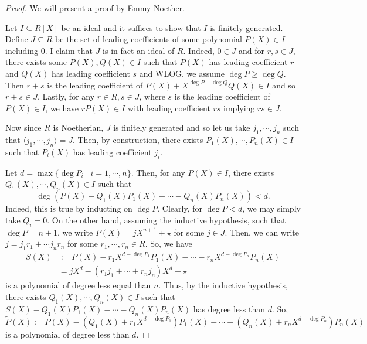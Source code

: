 \documentclass[]{article}
\theoremstyle{definition}
\theoremstyle{definition}
\begin{document}
\begin{proof}
  We will present a proof by Emmy Noether. 

  Let \(I \subseteq R[X]\) be an ideal and it suffices to show that \(I\) is 
  finitely generated. Define \(J \subseteq R\) be the set of leading coefficients 
  of some polynomial \(P(X) \in I\) including 0. I claim that \(J\) is in fact 
  an ideal of \(R\). Indeed, \(0 \in J\) and for \(r, s \in J\), there exists 
  some \(P(X), Q(X) \in I\) such that \(P(X)\) has leading coefficient \(r\) and 
  \(Q(X)\) has leading coefficient \(s\) and WLOG. we assume \(\deg P \ge \deg Q\). 
  Then \(r + s\) is the leading 
  coefficient of \(P(X) + X^{\deg P - \deg Q}Q(X) \in I\) and so \(r + s \in J\). Lastly, 
  for any \(r \in R, s \in J\), where \(s\) is the leading coefficient of 
  \(P(X) \in I\), we have \(r P(X) \in I\) with leading coefficient \(rs\) 
  implying \(rs \in J\).

  Now since \(R\) is Noetherian, \(J\) is finitely generated and so let us take 
  \(j_1, \cdots, j_n\) such that \(\langle j_1, \cdots, j_n \rangle = J\). 
  Then, by construction, there exists \(P_1(X), \cdots, P_n(X) \in I\) 
  such that \(P_i(X)\) has leading coefficient \(j_i\).

  Let \(d = \max \{\deg P_i \mid i = 1, \cdots, n\}\). Then, for any \(P(X) \in I\), 
  there exists \(Q_1(X), \cdots, Q_n(X) \in I\) such that 
  \[\deg(P(X) - Q_1(X)P_1(X) - \cdots - Q_n(X)P_n(X)) < d.\]
  Indeed, this is true by inducting on \(\deg P\). Clearly, for \(\deg P < d\), 
  we may simply take \(Q_i = 0\). On the other hand, assuming the inductive 
  hypothesis, such that \(\deg P = n + 1\), we write \(P(X) = j X^{n + 1} + \star\) 
  for some \(j \in J\). Then, we can write \(j = j_1 r_1 + \cdots j_n r_n\) for 
  some \(r_1, \cdots, r_n \in R\). So, 
  we have 
  \[\begin{split}
    S(X) & := P(X) - r_1 X^{d - \deg P_1}P_1(X) - \cdots -
    r_n X^{d - \deg P_n}P_n(X)\\
    & = jX^d - (r_1 j_1 + \cdots + r_n j_n)X^d + \star
  \end{split}\]
  is a polynomial of degree less equal than \(n\). Thus, by the 
  inductive hypothesis, there exists \(Q_1(X), \cdots, Q_n(X) \in I\) such that
  \(S(X) - Q_1(X)P_1(X) - \cdots - Q_n(X)P_n(X)\) has degree less than \(d\).
  So, 
  \[\tilde P(X) := P(X) - (Q_1(X) + r_1X^{d - \deg P_1})P_1(X) - \cdots -
    (Q_n(X) + r_nX^{d - \deg P_n})P_n(X)\]
  is a polynomial of degree less than \(d\).


\end{proof}
\end{document}
